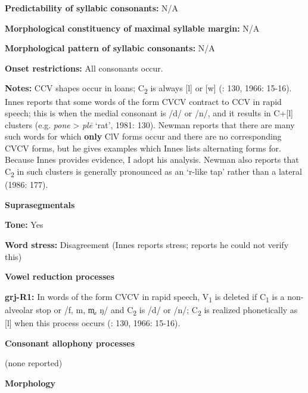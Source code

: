\textbf{Predictability of syllabic consonants:} N/A



\textbf{Morphological constituency of maximal syllable margin:} N/A



\textbf{Morphological pattern of syllabic consonants:} N/A



\textbf{Onset restrictions:} All consonants occur.



\textbf{Notes:} CCV shapes occur in loans; C\textsubscript{2} is always [l] or [w] (\citealt{Innes1981}: 130, 1966: 15-16). Innes reports that some words of the form CVCV contract to CCV in rapid speech; this is when the medial consonant is /d/ or /n/, and it results in C+[l] clusters (e.g. \textit{pone} > \textit{plē} ‘rat’, 1981: 130). Newman reports that there are many such words for which \textbf{only} ClV forms occur and there are no corresponding CVCV forms, but he gives examples which Innes lists alternating forms for. Because Innes provides evidence, I adopt his analysis. Newman also reports that C\textsubscript{2} in such clusters is generally pronounced as an ‘r-like tap’ rather than a lateral (1986: 177).



\textbf{Suprasegmentals}



\textbf{Tone:} Yes



\textbf{Word stress:} Disagreement (Innes reports stress; \citealt{Newman1986} reports he could not verify this)



\textbf{Vowel reduction processes}



\textbf{grj-R1:} In words of the form CVCV in rapid speech, V\textsubscript{1} is deleted if C\textsubscript{1} is a non-alveolar stop or /f, m, m̥, ŋ/ and C\textsubscript{2} is /d/ or /n/; C\textsubscript{2} is realized phonetically as [l] when this process occurs (\citealt{Innes1981}: 130, 1966: 15-16).



\textbf{Consonant allophony processes}



(none reported)



\textbf{Morphology}



